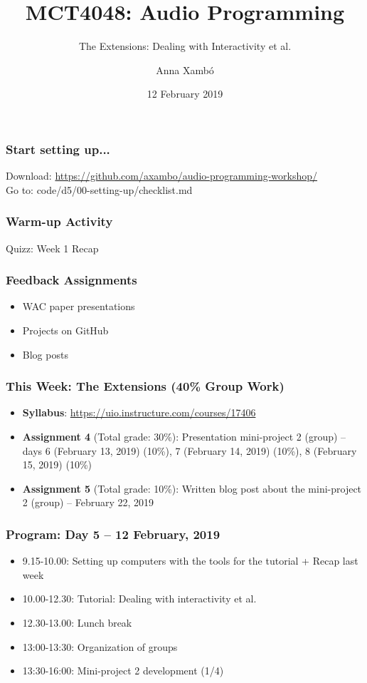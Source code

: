 \documentclass[screen, aspectratio=43]{beamer}
\title[AP-intro]{MCT4048: Audio Programming}
\subtitle{The Extensions: Dealing with Interactivity et al.}
\author[A. Xamb{\'o}]{Anna Xamb{\'o}}
\institute[NTNU]{Department of Music, NTNU}
\date{12 February 2019}
\begin{document}
\begin{frame}
  \titlepage
\end{frame}
%
\begin{frame}
\frametitle{Start setting up...}
Download: \url{https://github.com/axambo/audio-programming-workshop/} 
\\
\vspace{10 mm}
Go to: \textrm{code/d5/00-setting-up/checklist.md}
\end{frame}
%
\begin{frame}
\frametitle{Warm-up Activity}
Quizz: Week 1 Recap
\end{frame}
%
\begin{frame}
\frametitle{Feedback Assignments}
\begin{itemize}
\item WAC paper presentations
\item Projects on GitHub
\item Blog posts
\end{itemize}
\end{frame}
%
\begin{frame}
\frametitle{This Week: The Extensions (40\% Group Work)}
\begin{itemize}
\item \textbf{Syllabus}: \url{https://uio.instructure.com/courses/17406}
\item \textbf{Assignment 4} (Total grade: 30\%): Presentation mini-project 2 (group) -- days 6 (February 13, 2019) (10\%), 7 (February 14, 2019) (10\%), 8 (February 15, 2019) (10\%)
\item \textbf{Assignment 5} (Total grade: 10\%):  Written blog post about the mini-project 2 (group) -- February 22, 2019
\end{itemize}
\end{frame}
%
\begin{frame}
\frametitle{Program: Day 5 -- 12 February, 2019}
\begin{itemize}
\item 9.15-10.00: Setting up computers with the tools for the tutorial + Recap last week
\item 10.00-12.30: Tutorial: Dealing with interactivity et al.
\item 12.30-13.00: Lunch break
\item 13:00-13:30: Organization of groups
\item 13:30-16:00: Mini-project 2 development (1/4)
\end{itemize}
\end{frame}
%
\end{document}
